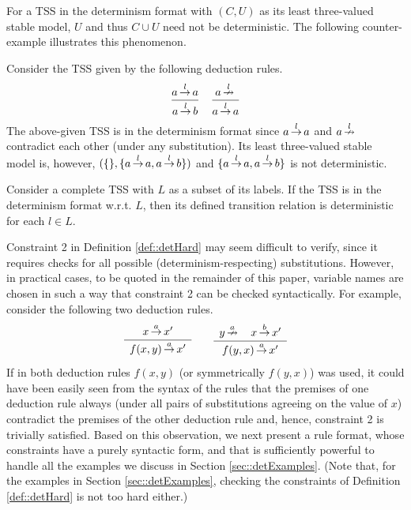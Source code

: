 
For a TSS in the determinism format with $(C, U)$ as its least three-valued stable model, $U$ and thus $C \cup U$ need not be deterministic.
The following counter-example illustrates this phenomenon.

\begin{example}
Consider the TSS given by the following deduction rules.
\[
\sosrule[]{a \trans{l} a}{a \trans{l} b} \quad \sosrule[]{a \ntrans{l}}{a \trans{l} a}
\]
The above-given TSS is in the determinism format since $a \,{\stackrel{{l}}{\rightarrow}}\, a$ and $a \,{\stackrel{{l}}{\nrightarrow}}\,$ contradict each other (under any substitution).
Its least three-valued stable model is, however, $(\{\}, \{a \,{\stackrel{{l}}{\rightarrow}}\, a, a \,{\stackrel{{l}}{\rightarrow}}\, b\})$ and $\{a \,{\stackrel{{l}}{\rightarrow}}\, a, a \,{\stackrel{{l}}{\rightarrow}}\, b\}$ is not deterministic.
\end{example}

\begin{corollary}
Consider a complete TSS with $L$ as a subset of its labels. If the TSS is in the determinism format w.r.t. $L$, then its defined transition relation is deterministic for each $l \in L$.
\end{corollary}

Constraint 2 in Definition \ref{def::detHard} may seem difficult to verify,
since it requires checks for all possible (determinism-respecting) substitutions.
However, in practical cases, to be quoted in the remainder of this paper,
variable names are chosen in such a way that constraint 2
can be checked syntactically.
For example, consider the following two deduction rules.
\[
\sosrule{x \trans{a} x'}{f(x,y) \trans{a} x'} \qquad
\sosrule{y \ntrans{a} \quad x \trans{b} x'}{f(y,x) \trans{a} x'}
\]
If in both deduction rules $f(x,y)$ (or symmetrically $f(y,x)$) was used,
it could have been easily seen from the syntax of the rules that the premises of one deduction rule
always (under all pairs of substitutions agreeing on the value of $x$) contradict the premises of the other deduction rule and, hence, constraint 2 is trivially satisfied.
Based on this observation, we next present a rule format, whose constraints
have a purely syntactic form,
and that is sufficiently powerful to handle all the examples we discuss
in Section \ref{sec::detExamples}.
(Note that, for the examples in Section \ref{sec::detExamples}, checking the constraints of Definition \ref{def::detHard} is
not too hard either.)



